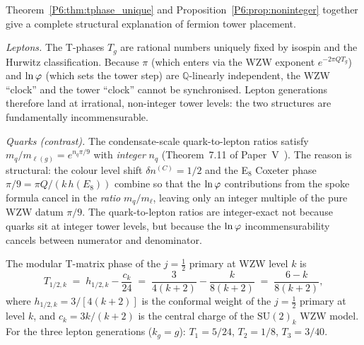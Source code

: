 \begin{remark}
\label{P6:rem:incommensurability}
Theorem~\ref{P6:thm:tphase_unique} and Proposition~\ref{P6:prop:noninteger}
together give a complete structural explanation of fermion tower placement.

\emph{Leptons.}
The T-phases $T_g$ are rational numbers uniquely fixed by isospin and
the Hurwitz classification.
Because $\pi$ (which enters via the WZW exponent $e^{-2\pi Q T_g}$) and
$\ln\varphi$ (which sets the tower step) are $\mathbb{Q}$-linearly independent,
the WZW ``clock'' and the tower ``clock'' cannot be synchronised.
Lepton generations therefore land at irrational, non-integer tower levels:
the two structures are fundamentally incommensurable.

\emph{Quarks (contrast).}
The condensate-scale quark-to-lepton ratios satisfy
$m_q/m_{\ell(g)} = e^{n_q\pi/9}$ with \emph{integer} $n_q$
(Theorem~7.11 of Paper~V~\cite{Paper5}).
The reason is structural: the colour level shift $\delta n^{(C)}=1/2$
and the E$_8$ Coxeter phase $\pi/9 = \pi Q/(k\,h(E_8))$ combine so
that the $\ln\varphi$ contributions from the spoke formula cancel in the
\emph{ratio} $m_q/m_\ell$, leaving only an integer multiple of the
pure WZW datum $\pi/9$.
The quark-to-lepton ratios are integer-exact not because quarks sit at
integer tower levels, but because the $\ln\varphi$ incommensurability
cancels between numerator and denominator.
\end{remark}

\begin{lemma}
\label{P6:lem:tmatrix}
The modular T-matrix phase of the $j=\tfrac{1}{2}$ primary at
WZW level $k$ is
\begin{equation}
  T_{1/2,k}
  \;=\; h_{1/2,k} - \frac{c_k}{24}
  \;=\; \frac{3}{4(k+2)} - \frac{k}{8(k+2)}
  \;=\; \frac{6-k}{8(k+2)},
  \label{P6:eq:tmatrix_formula}
\end{equation}
where $h_{1/2,k} = 3/[4(k+2)]$ is the conformal weight of the $j=\tfrac{1}{2}$
primary at level $k$, and $c_k = 3k/(k+2)$ is the central charge of the
$\mathrm{SU}(2)_k$ WZW model.
For the three lepton generations ($k_g = g$):
$T_1 = 5/24$, $T_2 = 1/8$, $T_3 = 3/40$.
\end{lemma}

